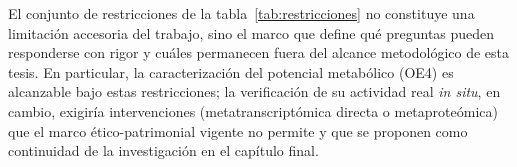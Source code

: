 El conjunto de restricciones de la tabla~\ref{tab:restricciones} no
constituye una limitación accesoria del trabajo, sino el marco que
define qué preguntas pueden responderse con rigor y cuáles permanecen
fuera del alcance metodológico de esta tesis. En particular, la
caracterización del potencial metabólico (OE4) es alcanzable bajo estas
restricciones; la verificación de su actividad real \textit{in situ},
en cambio, exigiría intervenciones (metatranscriptómica directa o
metaproteómica) que el marco ético-patrimonial vigente no permite y
que se proponen como continuidad de la investigación en el capítulo
final.
